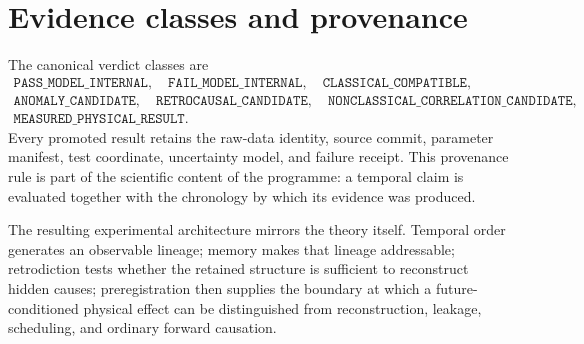\section{Evidence classes and provenance}

The canonical verdict classes are
\[
\begin{gathered}
\texttt{PASS\_MODEL\_INTERNAL},\quad
\texttt{FAIL\_MODEL\_INTERNAL},\quad
\texttt{CLASSICAL\_COMPATIBLE},\\
\texttt{ANOMALY\_CANDIDATE},\quad
\texttt{RETROCAUSAL\_CANDIDATE},\quad
\texttt{NONCLASSICAL\_CORRELATION\_CANDIDATE},\\
\texttt{MEASURED\_PHYSICAL\_RESULT}.
\end{gathered}
\]
Every promoted result retains the raw-data identity, source commit, parameter manifest, test coordinate, uncertainty model, and failure receipt. This provenance rule is part of the scientific content of the programme: a temporal claim is evaluated together with the chronology by which its evidence was produced.

The resulting experimental architecture mirrors the theory itself. Temporal order generates an observable lineage; memory makes that lineage addressable; retrodiction tests whether the retained structure is sufficient to reconstruct hidden causes; preregistration then supplies the boundary at which a future-conditioned physical effect can be distinguished from reconstruction, leakage, scheduling, and ordinary forward causation.
